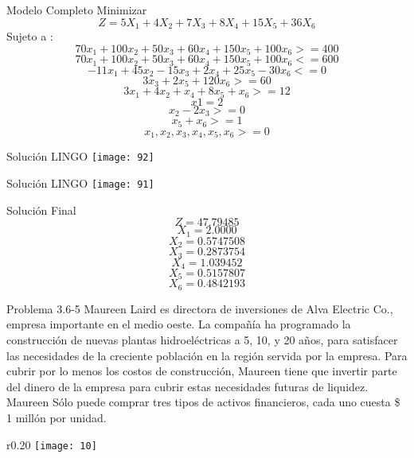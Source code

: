 \documentclass{beamer}
\begin{document}
\begin{frame}[fragile]{Modelo Completo}
Minimizar\\
\[Z = 5X_{1} + 4X_{2} +7X_{3} + 8X_{4} + 15X_{5} +36X_{6}\]
Sujeto a :\\
\[70x_{1} + 100x_{2} + 50x_{3} + 60x_{4} + 150x_{5} + 100x_{6} >= 400\]
\[70x_{1} + 100x_{2} + 50x_{3} + 60x_{4} + 150x_{5} + 100x_{6} <= 600\]
\[-11x_{1} + 45x_{2} - 15x_{3} + 2x_{4} + 25x_{5} - 30x_{6}  <=  0\]
\[3x_{3} + 2x_{5} + 120x_{6} >= 60\]
\[3x_{1} + 4x_{2} + x_{4} + 8x_{5} + x_{6} >= 12\]
\[x{1} = 2\]
\[x_{2} - 2x_{3} >= 0\]
\[x_{5} + x_{6} >= 1 \]
\[x_{1}, x_{2}, x_{3}, x_{4}, x_{5}, x_{6} >= 0\]

\end{frame}

\begin{frame}[fragile]{Soluci\'on LINGO}
    \texttt{[image: 92]}
\end{frame}
\begin{frame}[fragile]{Soluci\'on LINGO}
    \texttt{[image: 91]}
\end{frame}

\begin{frame}[fragile]{Soluci\'on Final}
\[Z = 47.79485 \]
\[X_{1} = 2.0000\]
\[X_{2} = 0.5747508\]
\[X_{3} = 0.2873754\]
\[X_{4} = 1.039452\]
\[X_{5} = 0.5157807\]
\[X_{6} = 0.4842193\]
\end{frame}

\begin{frame}[t,fragile]{Problema 3.6-5 }
Maureen Laird es directora de inversiones de Alva Electric Co., empresa importante en el medio oeste. La compañ\'ia ha programado la construcci\'on de nuevas plantas hidroel\'ectricas a 5, 10, y 20 años, para satisfacer las necesidades de la creciente poblaci\'on en la regi\'on servida por la empresa. Para cubrir por lo menos los costos de construcci\'on, Maureen tiene que invertir parte del dinero de  la empresa para cubrir estas necesidades futuras de liquidez. Maureen S\'olo puede comprar tres tipos de activos financieros, cada uno  cuesta \$ 1 mill\'on por unidad.
 \begin{wrapfigure}{r}{0.20\textwidth}
    \centering
    \texttt{[image: 10]}
\end{wrapfigure}
\end{frame}
\end{document}
